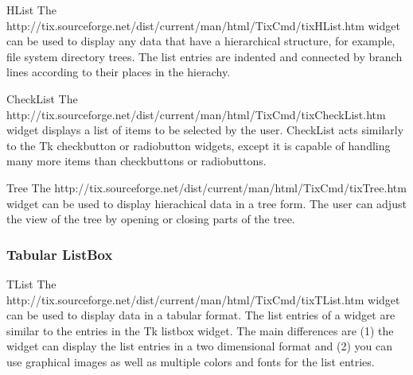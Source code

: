 \begin{classdesc}{HList}{}
The 
{http://tix.sourceforge.net/dist/current/man/html/TixCmd/tixHList.htm}
widget can be used to display any data that have a hierarchical
structure, for example, file system directory trees. The list entries
are indented and connected by branch lines according to their places
in the hierachy.
\end{classdesc}


\begin{classdesc}{CheckList}{}
The 
{http://tix.sourceforge.net/dist/current/man/html/TixCmd/tixCheckList.htm}
widget displays a list of items to be selected by the user. CheckList
acts similarly to the Tk checkbutton or radiobutton widgets, except it
is capable of handling many more items than checkbuttons or
radiobuttons.
\end{classdesc}


\begin{classdesc}{Tree}{}
The 
{http://tix.sourceforge.net/dist/current/man/html/TixCmd/tixTree.htm}
widget can be used to display hierachical data in a tree form. The
user can adjust the view of the tree by opening or closing parts of
the tree.
\end{classdesc}




\subsubsection{Tabular ListBox}

\begin{classdesc}{TList}{}
The 
{http://tix.sourceforge.net/dist/current/man/html/TixCmd/tixTList.htm}
widget can be used to display data in a tabular format. The list
entries of a  widget are similar to the entries in the Tk
listbox widget.  The main differences are (1) the  widget
can display the list entries in a two dimensional format and (2) you
can use graphical images as well as multiple colors and fonts for the
list entries.
\end{classdesc}


